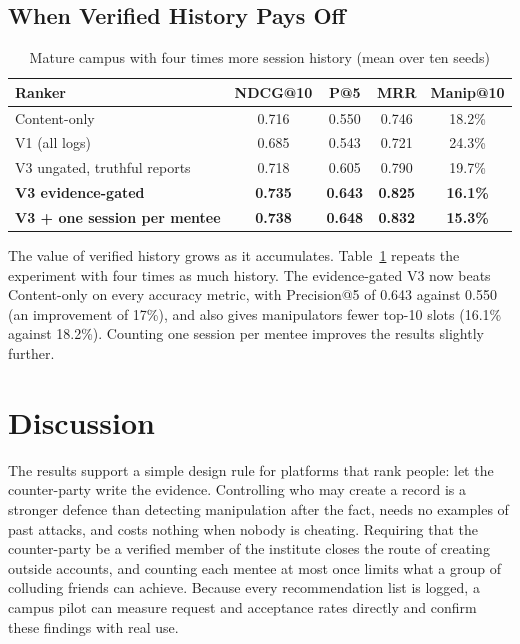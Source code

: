 \documentclass[12pt,a4paper]{report}
\begin{document}
\subsection{When Verified History Pays Off}
\begin{table}[h]
\centering
\caption{Mature campus with four times more session history (mean over ten seeds)}
\label{tab:mature}
\small
\begin{tabular}{lcccc}
\toprule
\textbf{Ranker} & \textbf{NDCG@10} & \textbf{P@5} & \textbf{MRR} & \textbf{Manip@10}\\
\midrule
Content-only & 0.716 & 0.550 & 0.746 & 18.2\%\\
V1 (all logs) & 0.685 & 0.543 & 0.721 & 24.3\%\\
V3 ungated, truthful reports & 0.718 & 0.605 & 0.790 & 19.7\%\\
\textbf{V3 evidence-gated} & \textbf{0.735} & \textbf{0.643} & \textbf{0.825} & \textbf{16.1\%}\\
\textbf{V3 + one session per mentee} & \textbf{0.738} & \textbf{0.648} & \textbf{0.832} & \textbf{15.3\%}\\
\bottomrule
\end{tabular}
\end{table}

The value of verified history grows as it accumulates. Table~\ref{tab:mature} repeats the experiment with four times as much history. The evidence-gated V3 now beats Content-only on every accuracy metric, with Precision@5 of 0.643 against 0.550 (an improvement of 17\%), and also gives manipulators fewer top-10 slots (16.1\% against 18.2\%). Counting one session per mentee improves the results slightly further.

\section{Discussion}
The results support a simple design rule for platforms that rank people: let the counter-party write the evidence. Controlling who may create a record is a stronger defence than detecting manipulation after the fact, needs no examples of past attacks, and costs nothing when nobody is cheating. Requiring that the counter-party be a verified member of the institute closes the route of creating outside accounts, and counting each mentee at most once limits what a group of colluding friends can achieve. Because every recommendation list is logged, a campus pilot can measure request and acceptance rates directly and confirm these findings with real use.
\end{document}
